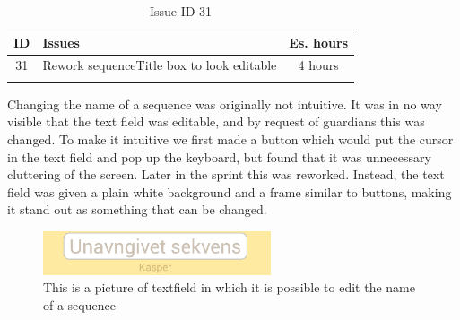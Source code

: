 \begin{longtable} { | c | p{12cm} | c | } 
\hline
	ID 	&	Issues	&		 Es. hours \\\hline
	31 	&	Rework sequenceTitle box to look editable	&	4 hours \\\hline
\caption{Issue ID 31}
\label{tab:spr2_reworktitlebox}
\end{longtable}

Changing the name of a sequence was originally not intuitive. It was in no way visible that the text field was editable, and by request of guardians this was changed. To make it intuitive we first made a button which would put the cursor in the text field and pop up the keyboard, but found that it was unnecessary cluttering of the screen. Later in the sprint this was reworked. Instead, the text field was given a plain white background and a frame similar to buttons, making it stand out as something that can be changed.

\begin{figure} [h!]
\centering
\includegraphics[width=0.6\textwidth]{Pics/Sprint2/editName/editTheName.png}
\caption{This is a picture of textfield in which it is possible to edit the name of a sequence}
\label{fig:new_editName}
\end{figure}
